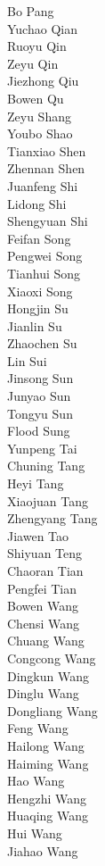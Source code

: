 Bo Pang\\
Yuchao Qian\\
Ruoyu Qin\\
Zeyu Qin\\
Jiezhong Qiu\\
Bowen Qu\\
Zeyu Shang\\
Youbo Shao\\
Tianxiao Shen\\
Zhennan Shen\\
Juanfeng Shi\\
Lidong Shi\\
Shengyuan Shi\\
Feifan Song\\
Pengwei Song\\
Tianhui Song\\
Xiaoxi Song\\
Hongjin Su\\
Jianlin Su\\
Zhaochen Su\\
Lin Sui\\
Jinsong Sun\\
Junyao Sun\\
Tongyu Sun\\
Flood Sung\\
Yunpeng Tai\\
Chuning Tang\\
Heyi Tang\\
Xiaojuan Tang\\
Zhengyang Tang\\
Jiawen Tao\\
Shiyuan Teng\\
Chaoran Tian\\
Pengfei Tian\\
Bowen Wang\\
Chensi Wang\\
Chuang Wang\\
Congcong Wang\\
Dingkun Wang\\
Dinglu Wang\\
Dongliang Wang\\
Feng Wang\\
Hailong Wang\\
Haiming Wang\\
Hao Wang\\
Hengzhi Wang\\
Huaqing Wang\\
Hui Wang\\
Jiahao Wang\\
